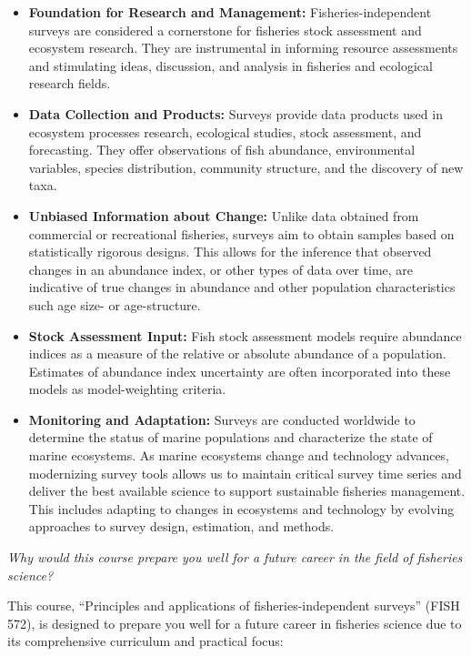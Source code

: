 \documentclass[
  letterpaper,
  oneside,
  open=any]{scrbook}
\providecommand{\tightlist}{%
  \setlength{\itemsep}{0pt}\setlength{\parskip}{0pt}}\usepackage{longtable,booktabs,array}
\begin{document}
\begin{itemize}
\tightlist
\item
  \textbf{Foundation for Research and Management:} Fisheries-independent
  surveys are considered a cornerstone for fisheries stock assessment
  and ecosystem research. They are instrumental in informing resource
  assessments and stimulating ideas, discussion, and analysis in
  fisheries and ecological research fields.
\item
  \textbf{Data Collection and Products:} Surveys provide data products
  used in ecosystem processes research, ecological studies, stock
  assessment, and forecasting. They offer observations of fish
  abundance, environmental variables, species distribution, community
  structure, and the discovery of new taxa.
\item
  \textbf{Unbiased Information about Change:} Unlike data obtained from
  commercial or recreational fisheries, surveys aim to obtain samples
  based on statistically rigorous designs. This allows for the inference
  that observed changes in an abundance index, or other types of data
  over time, are indicative of true changes in abundance and other
  population characteristics such age size- or age-structure.
\item
  \textbf{Stock Assessment Input:} Fish stock assessment models require
  abundance indices as a measure of the relative or absolute abundance
  of a population. Estimates of abundance index uncertainty are often
  incorporated into these models as model-weighting criteria.
\item
  \textbf{Monitoring and Adaptation:} Surveys are conducted worldwide to
  determine the status of marine populations and characterize the state
  of marine ecosystems. As marine ecosystems change and technology
  advances, modernizing survey tools allows us to maintain critical
  survey time series and deliver the best available science to support
  sustainable fisheries management. This includes adapting to changes in
  ecosystems and technology by evolving approaches to survey design,
  estimation, and methods.
\end{itemize}

\emph{Why would this course prepare you well for a future career in the
field of fisheries science?}

This course, ``Principles and applications of fisheries-independent
surveys'' (FISH 572), is designed to prepare you well for a future
career in fisheries science due to its comprehensive curriculum and
practical focus:
\end{document}
